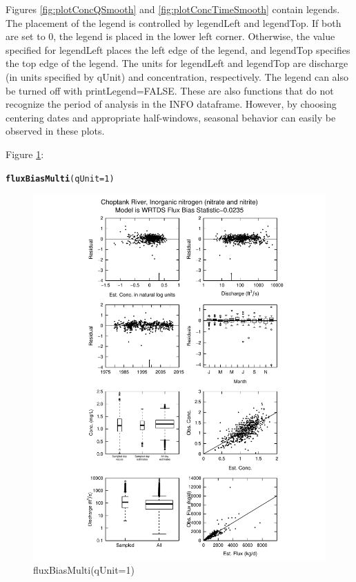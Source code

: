 \documentclass[a4paper,11pt]{article}\usepackage[]{graphicx}\usepackage[]{color}
\makeatletter
\def\maxwidth{ %
  \ifdim\Gin@nat@width>\linewidth
    \linewidth
  \else
    \Gin@nat@width
  \fi
}
\newcommand{\hlnum}[1]{\textcolor[rgb]{0.686,0.059,0.569}{#1}}%
\newcommand{\hlstd}[1]{\textcolor[rgb]{0.345,0.345,0.345}{#1}}%
\newcommand{\hlkwc}[1]{\textcolor[rgb]{0.333,0.667,0.333}{#1}}%
\newcommand{\hlkwd}[1]{\textcolor[rgb]{0.737,0.353,0.396}{\textbf{#1}}}%
\newenvironment{kframe}{%
 \def\at@end@of@kframe{}%
 \ifinner\ifhmode%
  \def\at@end@of@kframe{\end{minipage}}%
  \begin{minipage}{\columnwidth}%
 \fi\fi%
 \def\FrameCommand##1{\hskip\@totalleftmargin \hskip-\fboxsep
 \colorbox{shadecolor}{##1}\hskip-\fboxsep
     \hskip-\linewidth \hskip-\@totalleftmargin \hskip\columnwidth}%
 \MakeFramed {\advance\hsize-\width
   \@totalleftmargin\z@ \linewidth\hsize
   \@setminipage}}%
 {\par\unskip\endMakeFramed%
 \at@end@of@kframe}
\newenvironment{knitrout}{}{} %
\makeatother
\begin{document}
Figures \ref{fig:plotConcQSmooth} and \ref{fig:plotConcTimeSmooth} contain legends. The placement of the legend is controlled by legendLeft and legendTop. If both are set to 0, the legend is placed in the lower left corner. Otherwise, the value specified for legendLeft places the left edge of the legend, and legendTop specifies the top edge of the legend. The units for legendLeft and legendTop are discharge (in units specified by qUnit) and concentration, respectively. The legend can also be turned off with printLegend=FALSE. These are also functions that do not recognize the period of analysis in the INFO dataframe. However, by choosing centering dates and appropriate half-windows, seasonal behavior can easily be observed in these plots. 


Figure \ref{fig:fluxBiasMulti}:
\begin{knitrout}
\color{fgcolor}\begin{kframe}
\begin{alltt}
\hlkwd{fluxBiasMulti}\hlstd{(}\hlkwc{qUnit}\hlstd{=}\hlnum{1}\hlstd{)}
\end{alltt}
\end{kframe}\begin{figure}[]

\includegraphics[width=\maxwidth]{figure/fluxBiasMulti} \caption[fluxBiasMulti(qUnit=1)]{fluxBiasMulti(qUnit=1)\label{fig:fluxBiasMulti}}
\end{figure}


\end{knitrout}
\end{document}
